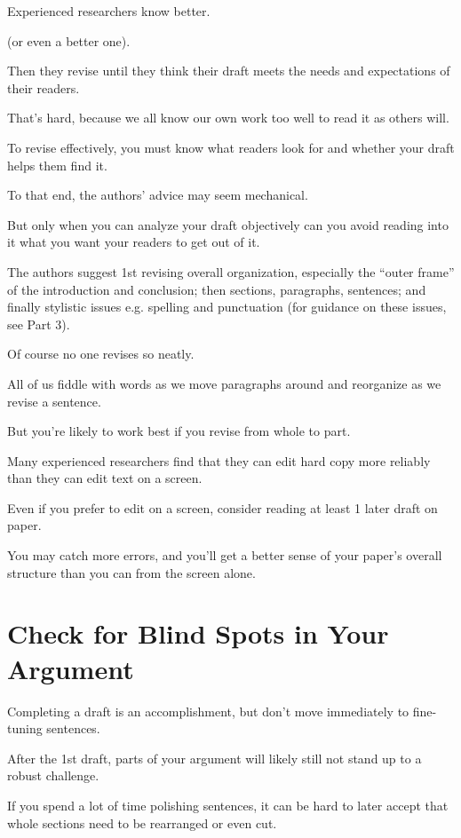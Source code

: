 \documentclass[oneside]{book}
\numberwithin{equation}{section}
\begin{document}
Experienced researchers know better.

 (or even a better one).

Then they revise until they think their draft meets the needs and expectations of their readers.

That's hard, because we all know our own work too well to read it as others will.

To revise effectively, you must know what readers look for and whether your draft helps them find it.

To that end, the authors' advice may seem mechanical.

But only when you can analyze your draft objectively can you avoid reading into it what you want your readers to get out of it.

%
The authors suggest 1st revising overall organization, especially the ``outer frame'' of the introduction and conclusion; then sections, paragraphs, sentences; and finally stylistic issues e.g. spelling and punctuation (for guidance on these issues, see Part 3).

Of course no one revises so neatly.

All of us fiddle with words as we move paragraphs around and reorganize as we revise a sentence.

But you're likely to work best if you revise from whole to part.

%
Many experienced researchers find that they can edit hard copy more reliably than they can edit text on a screen.

Even if you prefer to edit on a screen, consider reading at least 1 later draft on paper.

You may catch more errors, and you'll get a better sense of your paper's overall structure than you can from the screen alone.

\section{Check for Blind Spots in Your Argument}
Completing a draft is an accomplishment, but don't move immediately to fine-tuning sentences.

After the 1st draft, parts of your argument will likely still not stand up to a robust challenge.

If you spend a lot of time polishing sentences, it can be hard to later accept that whole sections need to be rearranged or even cut.
\end{document}
